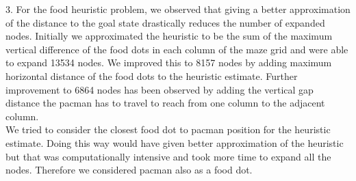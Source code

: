 \documentclass[11pt]{article}
\begin{document}
3. For the food heuristic problem, we observed that giving a better approximation of the distance to the goal state drastically reduces the number of expanded nodes. Initially we approximated the heuristic to be the sum of the  maximum vertical difference of the food dots  in each column  of the maze grid and were able to expand 13534 nodes. We improved this to 8157 nodes by adding  maximum horizontal distance of the food dots to the heuristic estimate. Further improvement to 6864 nodes has been observed by adding the vertical gap distance the pacman has to travel to reach from one column to the  adjacent column.\\
  We tried to consider the closest food dot to pacman position for the heuristic estimate. Doing this way would have given better approximation of the heuristic  but that was computationally intensive and took more time to expand all the nodes. Therefore we considered pacman also as a food dot. 
\end{document}
